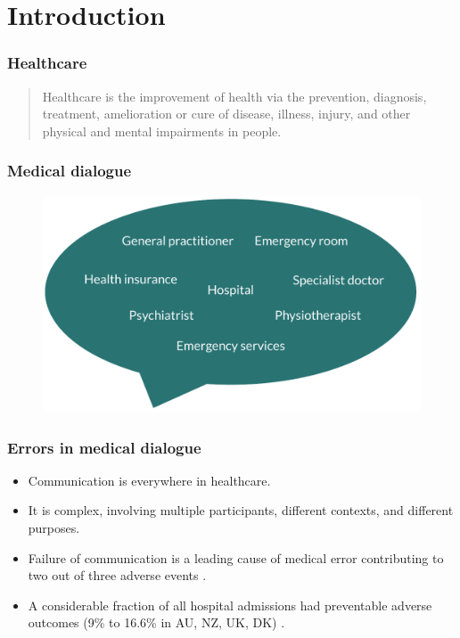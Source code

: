 
\section{Introduction}

\frame{\tableofcontents[currentsection]}


\begin{frame}
    \frametitle{Healthcare}
    \begin{quotation}
        \noindent\centering
        Healthcare is the improvement of health via the {\color{dtured}prevention}, {\color{dtured}diagnosis}, {\color{dtured}treatment}, {\color{dtured}amelioration} or {\color{dtured}cure} of {\color{theme-green}disease}, {\color{theme-green}illness}, {\color{theme-green}injury}, and {\color{theme-green}other physical and mental impairments} in people.
    \end{quotation}
\end{frame}


\begin{frame}
    \frametitle{Medical dialogue}
    \begin{figure}
        \centering
        \includegraphics[width=0.7\paperwidth]{figures/speech_bubble.pdf}
    \end{figure}

\end{frame}


\begin{frame}
    \frametitle{Errors in medical dialogue}
    \begin{itemize}
        \item<1,2>Communication is everywhere in healthcare. 
        \item <1,2>It is complex, involving multiple participants, different contexts, and different purposes.
        \item <2> {\color{dtured} } Failure of communication is a leading cause of medical error contributing to two out of three adverse events \cite{starmer_changes_2014}.
        \item <2> A considerable fraction of all hospital admissions had preventable adverse outcomes (9\% to 16.6\% in AU, NZ, UK, DK) \cite{carver_medical_2024}.
    \end{itemize}
\end{frame}


